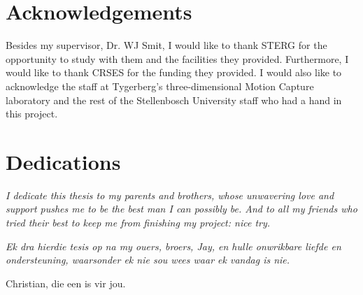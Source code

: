 \chapter{Acknowledgements}%

Besides my supervisor, Dr. WJ Smit, I would like to thank STERG for the opportunity to study with them and the facilities they provided. Furthermore, I would like to thank CRSES for the funding they provided. I would also like to acknowledge the staff at Tygerberg's three-dimensional Motion Capture laboratory and the rest of the Stellenbosch University staff who had a hand in this project.

\chapter{Dedications}%

\vfill
\begin{center}\itshape%
  I dedicate this thesis to my parents and brothers, whose unwavering love and support pushes me to be the best man I can possibly be. And to all my friends who tried their best to keep me from finishing my project: nice try.
\end{center}
\vfill

\vfill
\begin{Afr}
  \begin{center}\itshape%
    Ek dra hierdie tesis op na my ouers, broers, Jay, en hulle onwrikbare liefde en ondersteuning, waarsonder ek nie sou wees waar ek vandag is nie. 

    Christian, die een is vir jou.
  \end{center}
\end{Afr}
\vfill
\clearpage
	   
\endinput
